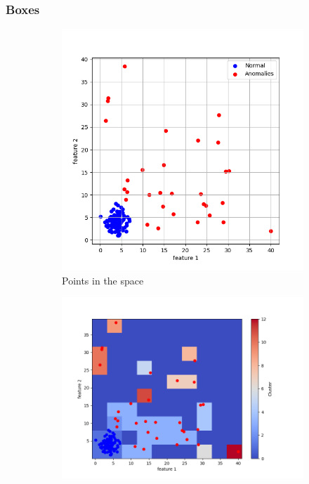 \documentclass[oneside, a4paper, onecolumn, 11pt]{article}
\begin{document}
\subsubsection{Boxes}
\begin{figure}[H]
  \centering
  \begin{subfigure}{0.27\textwidth}
      \centering
      \includegraphics[width=\linewidth]{images/cubepoints.png}
      \caption{Points in the space}
  \end{subfigure}
  \hfill
  \begin{subfigure}{0.35\textwidth}
      \centering
      \includegraphics[width=\linewidth]{images/bad clustercube2.png}

\end{subfigure}
\end{figure}
\end{document}
